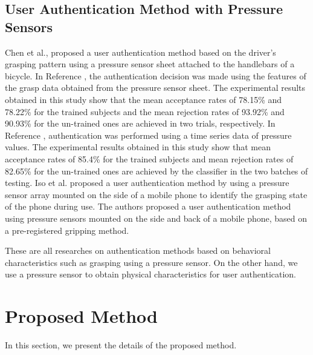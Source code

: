 \documentclass[english,preprint,JIP]{ipsj}
\begin{document}
\subsection{User Authentication Method with Pressure Sensors}
Chen et al.\cite{driver_handgrip_1}, \cite{driver_handgrip_2} proposed a user authentication method based on the driver's grasping pattern using a pressure sensor sheet attached to the handlebars of a bicycle. In Reference \cite{driver_handgrip_1}, the authentication decision was made using the features of the grasp data obtained from the pressure sensor sheet. The experimental results obtained in this study show that the mean acceptance rates of 78.15\% and 78.22\% for the trained subjects and the mean rejection rates of 93.92\% and 90.93\% for the un-trained ones are achieved in two trials, respectively. In Reference \cite{driver_handgrip_2}, authentication was performed using a time series data of pressure values. The experimental results obtained in this study show that mean acceptance rates of 85.4\% for the trained subjects and mean rejection rates of 82.65\% for the un-trained ones are achieved by the classifier in the two batches of testing. Iso et al.\cite{mobile_grip} proposed a user authentication method by using a pressure sensor array mounted on the side of a mobile phone to identify the grasping state of the phone during use. The authors proposed a user authentication method using pressure sensors mounted on the side and back of a mobile phone, based on a pre-registered gripping method\cite{murao_grip}.\par

These are all researches on authentication methods based on behavioral characteristics such as grasping using a pressure sensor. On the other hand, we use a pressure sensor to obtain physical characteristics for user authentication.



\section{Proposed Method}
\label{sec:method}
In this section, we present the details of the proposed method.


\end{document}
